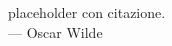 

\cleardoublepage
{}
\thispagestyle{empty}

\vspace*{3cm}

\begin{center}
	placeholder con citazione. \\ \medskip
	--- Oscar Wilde
\end{center}
\medskip

